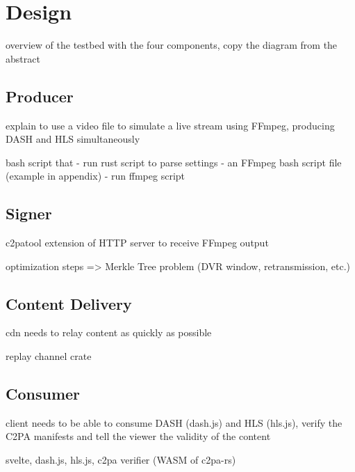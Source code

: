 \chapter{Design\label{cha:chapter4}}

overview of the testbed with the four components, copy the diagram from the abstract

\section{Producer\label{sec:producer}}

explain to use a video file to simulate a live stream using FFmpeg, producing DASH and HLS simultaneously

bash script that
    - run rust script to parse settings 
    - an FFmpeg bash script file (example in appendix)
    - run ffmpeg script

\section{Signer\label{sec:signer}}

c2patool extension of HTTP server to receive FFmpeg output

optimization steps => Merkle Tree problem (DVR window, retransmission, etc.)

\section{Content Delivery\label{sec:cdn}}

cdn needs to relay content as quickly as possible

replay channel crate

\section{Consumer\label{sec:consumer}}

client needs to be able to consume DASH (dash.js) and HLS (hls.js), verify the C2PA manifests and tell the viewer the validity of the content

svelte, dash.js, hls.js, c2pa verifier (WASM of c2pa-rs)

